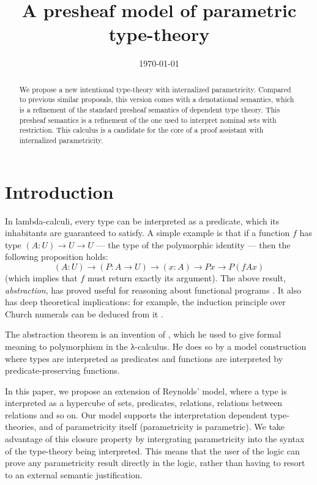 \documentclass[english]{PaperTools/latex/lipics}
\title{A presheaf model of parametric type-theory}
\author{}
\date{\today}
\begin{document}
\maketitle

\begin{abstract}
   We propose a new intentional type-theory with internalized
  parametricity. Compared to previous similar proposals, this version
  comes with a denotational semantics, which is a refinement of the
  standard presheaf semantics of dependent type theory. This presheaf
  semantics is a refinement of the one used to interpret nominal sets
  with restriction.
  This calculus is a candidate for the core of a proof assistant
  with internalized parametricity.
\end{abstract}

\section{Introduction}
In lambda-calculi, every type can be interpreted as a predicate, which
its inhabitants are guaranteed to satisfy.
%
A simple example is that if a function $f$ has type $(A : U) → U → U$ ---
the type of the polymorphic identity --- then the following
proposition holds:
%
\[
  (A : U) → (P : A → U) → (x : A) → P x → P (f A x)
\]
%
(which implies that $f$ must return exactly its argument).
The above result, \emph{abstraction}, has proved useful for reasoning
about functional programs \citep{wadler_theorems_1989}. It also has deep
theoretical implications: for example, the induction principle over Church numerals
can be deduced from it \citep{wadler_girardreynolds_2007}.


The abstraction theorem is an invention of
\citet{reynolds_types_1983}, which he used to give formal meaning to
polymorphism in the λ-calculus. He does so by a model construction
where types are interpreted as predicates and functions are interpreted
by predicate-preserving functions.

In this paper, we propose an extension of Reynolds' model, where a
type is interpreted as a hypercube of sets, predicates, relations,
relations between relations and so on. Our model
supports the interpretation dependent type-theories, and of
parametricity itself (parametricity is parametric).  We take advantage of this
closure property by intergrating parametricity into the syntax of the
type-theory being interpreted.  This means that the user of the logic
can prove any parametricity result directly in the logic, rather than
having to resort to an external semantic justification.
\end{document}
